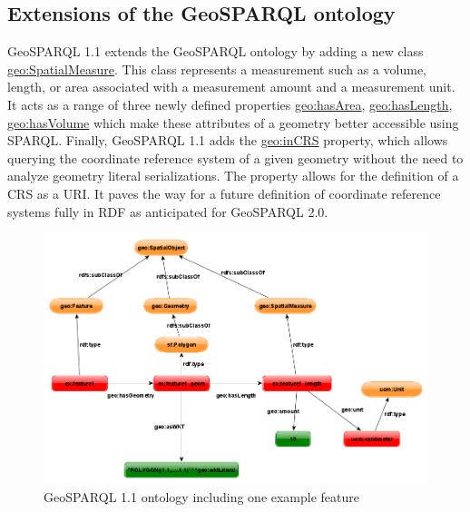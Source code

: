 \documentclass[runningheads]{llncs}
\begin{document}
\subsection{Extensions of the GeoSPARQL ontology}
\label{sec:ontologyextensions}
GeoSPARQL 1.1 extends the GeoSPARQL ontology by adding a new class \href{http://www.opengis.net/ont/geosparql#SpatialMeasure}{geo:SpatialMeasure}. This class represents a measurement such as a volume, length, or area associated with a measurement amount and a measurement unit. It acts as a range of three newly defined properties \href{http://www.opengis.net/ont/geosparql#hasVolume}{geo:hasArea}, \href{http://www.opengis.net/ont/geosparql#hasLength}{geo:hasLength},
\href{http://www.opengis.net/ont/geosparql#hasVolume}{geo:hasVolume} which make these attributes of a geometry better accessible using SPARQL. Finally, GeoSPARQL 1.1 adds the \href{http://www.opengis.net/ont/geosparql#inCRS}{geo:inCRS} property, which allows querying the coordinate reference system of a given geometry without the need to analyze geometry literal serializations. The property allows for the definition of a CRS as a URI. It paves the way for a future definition of coordinate reference systems fully in RDF as anticipated for GeoSPARQL 2.0.
\begin{figure}[htb]
    \centering
    \includegraphics[width=\linewidth]{images/geold_ontology.png}
    \caption{GeoSPARQL 1.1 ontology including one example feature}
    \label{fig:geosparql11ontology}
\end{figure}
\end{document}
